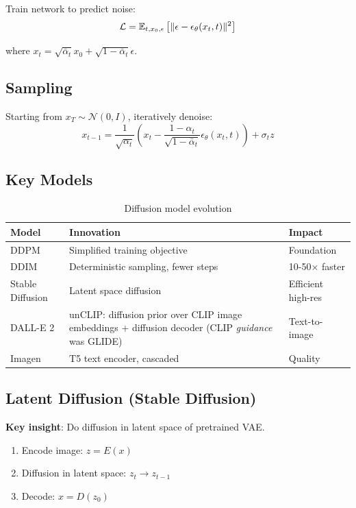 Train network to predict noise:
\begin{equation}
\mathcal{L} = \operatorname{\mathbb{E}}_{t, x_0, \epsilon}\left[\|\epsilon - \epsilon_\theta(x_t, t)\|^2\right]
\end{equation}

where $x_t = \sqrt{\bar{\alpha}_t} x_0 + \sqrt{1-\bar{\alpha}_t} \epsilon$.

\subsection{Sampling}

Starting from $x_T \sim \mathcal{N}(0, I)$, iteratively denoise:
\begin{equation}
x_{t-1} = \frac{1}{\sqrt{\alpha_t}}\left(x_t - \frac{1-\alpha_t}{\sqrt{1-\bar{\alpha}_t}} \epsilon_\theta(x_t, t)\right) + \sigma_t z
\end{equation}

\subsection{Key Models}

\begin{table}[H]
\centering
\caption{Diffusion model evolution}
\begin{tabularx}{\textwidth}{lXX}
\toprule
\textbf{Model} & \textbf{Innovation} & \textbf{Impact} \\
\midrule
DDPM & Simplified training objective & Foundation \\
DDIM & Deterministic sampling, fewer steps & 10-50× faster \\
Stable Diffusion & Latent space diffusion & Efficient high-res \\
DALL-E 2 & unCLIP: diffusion prior over CLIP image embeddings + diffusion decoder (CLIP \textit{guidance} was GLIDE) & Text-to-image \\
Imagen & T5 text encoder, cascaded & Quality \\
\bottomrule
\end{tabularx}
\end{table}

\subsection{Latent Diffusion (Stable Diffusion)}

\textbf{Key insight}: Do diffusion in latent space of pretrained VAE.

\begin{enumerate}
    \item Encode image: $z = E(x)$
    \item Diffusion in latent space: $z_t \to z_{t-1}$
    \item Decode: $x = D(z_0)$
\end{enumerate}

